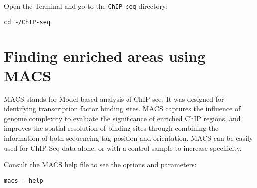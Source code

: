\begin{steps}
Open the Terminal and go to the \texttt{ChIP-seq} directory:
\begin{lstlisting}
cd ~/ChIP-seq
\end{lstlisting}
\end{steps}

\section{Finding enriched areas using MACS}

\begin{information}
MACS stands for Model based analysis of ChIP-seq. It was designed for
identifying transcription factor binding sites. MACS captures the influence of
genome complexity to evaluate the significance of enriched ChIP regions, and
improves the spatial resolution of binding sites through combining the
information of both sequencing tag position and orientation. MACS can be easily
used for ChIP-Seq data alone, or with a control sample to increase specificity.
\end{information}

\begin{steps}
Consult the MACS help file to see the options and parameters:

\begin{lstlisting}
macs --help
\end{lstlisting}
\end{steps}

